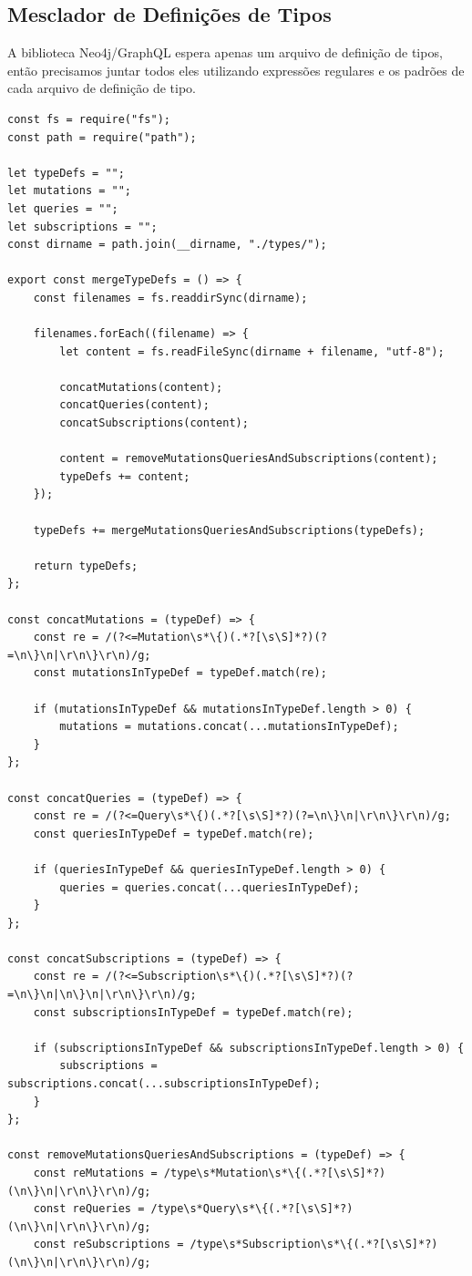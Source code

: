 \subsection{Mesclador de Definições de Tipos}
A biblioteca Neo4j/GraphQL espera apenas um arquivo de definição de tipos, então precisamos juntar todos eles utilizando expressões regulares e os padrões de cada arquivo de definição de tipo.
\begin{lstlisting}
const fs = require("fs");
const path = require("path");

let typeDefs = "";
let mutations = "";
let queries = "";
let subscriptions = "";
const dirname = path.join(__dirname, "./types/");

export const mergeTypeDefs = () => {
	const filenames = fs.readdirSync(dirname);

	filenames.forEach((filename) => {
		let content = fs.readFileSync(dirname + filename, "utf-8");

		concatMutations(content);
		concatQueries(content);
		concatSubscriptions(content);

		content = removeMutationsQueriesAndSubscriptions(content);
		typeDefs += content;
	});

	typeDefs += mergeMutationsQueriesAndSubscriptions(typeDefs);

	return typeDefs;
};

const concatMutations = (typeDef) => {
	const re = /(?<=Mutation\s*\{)(.*?[\s\S]*?)(?=\n\}\n|\r\n\}\r\n)/g;
	const mutationsInTypeDef = typeDef.match(re);

	if (mutationsInTypeDef && mutationsInTypeDef.length > 0) {
		mutations = mutations.concat(...mutationsInTypeDef);
	}
};

const concatQueries = (typeDef) => {
	const re = /(?<=Query\s*\{)(.*?[\s\S]*?)(?=\n\}\n|\r\n\}\r\n)/g;
	const queriesInTypeDef = typeDef.match(re);

	if (queriesInTypeDef && queriesInTypeDef.length > 0) {
		queries = queries.concat(...queriesInTypeDef);
	}
};

const concatSubscriptions = (typeDef) => {
	const re = /(?<=Subscription\s*\{)(.*?[\s\S]*?)(?=\n\}\n|\n\}\n|\r\n\}\r\n)/g;
	const subscriptionsInTypeDef = typeDef.match(re);

	if (subscriptionsInTypeDef && subscriptionsInTypeDef.length > 0) {
		subscriptions = subscriptions.concat(...subscriptionsInTypeDef);
	}
};

const removeMutationsQueriesAndSubscriptions = (typeDef) => {
	const reMutations = /type\s*Mutation\s*\{(.*?[\s\S]*?)(\n\}\n|\r\n\}\r\n)/g;
	const reQueries = /type\s*Query\s*\{(.*?[\s\S]*?)(\n\}\n|\r\n\}\r\n)/g;
	const reSubscriptions = /type\s*Subscription\s*\{(.*?[\s\S]*?)(\n\}\n|\r\n\}\r\n)/g;


\end{lstlisting}
